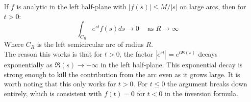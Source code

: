 If $f$ is analytic in the left half-plane with $|f(s)|\leq M/|s|$ on large arcs, then for $t>0$: 
\begin{equation}\label{Eq3.1.12}
    \int_{C_{R}}e^{st}f(s)ds\rightarrow 0 \ \ \ \ \text{ as } R\rightarrow\infty
\end{equation}
Where $C_{R}$ is the left semicircular arc of radius $R$.
\\ 
The reason this works is that for $t>0$, the factor $|e^{st}|=e^{t \Re(s)}$ decays exponentially as $\Re(s)\rightarrow -\infty$ in the left half-plane. This exponential decay is strong enough to kill the contribution from the arc even as it grows large. It is worth noting that this only works for $t>0$. For $t\leq 0$ the argument breaks down entirely, which is consistent with $f(t)=0$ for $t<0$ in the inversion formula. \cite{MethOfPhys,RedBook,TransformsTheory,YellowBook}

